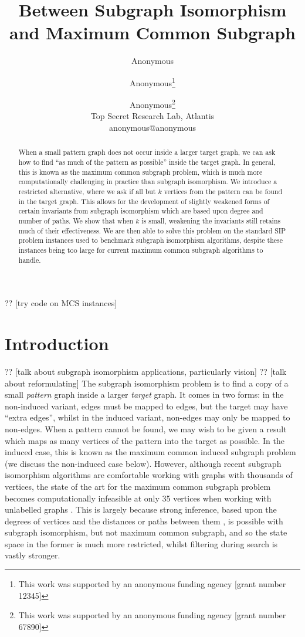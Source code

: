 \documentclass[letterpaper]{article}
\title{Between Subgraph Isomorphism and Maximum Common Subgraph}
\author{Anonymous \and Anonymous\thanks{This work was supported by an anonymous funding agency [grant number 12345]} \and Anonymous\thanks{This work was supported by an anonymous funding agency [grant number 67890]} \\
Top Secret Research Lab, Atlantis \\
anonymous@anonymous}
\newcommand{\citep}[1]{\cite{#1}}
\theoremstyle{definition}
\newcommand{\todo}[1]{{\color{red} {?? [}{#1}{]}}}
\begin{document}
\maketitle

\begin{abstract}
    When a small pattern graph does not occur inside a larger target graph, we can ask how to find
    ``as much of the pattern as possible'' inside the target graph. In general, this is known as the maximum
    common subgraph problem, which is much more computationally challenging in practice than
    subgraph isomorphism. We introduce a restricted alternative, where we ask if all but $k$
    vertices from the pattern can be found in the target graph. This allows for the development of
    slightly weakened forms of certain invariants from subgraph isomorphism which are based upon degree and
    number of paths.  We show that when $k$ is small, weakening the invariants still retains much of
    their effectiveness. We are then able to solve this problem on the standard SIP problem
    instances used to benchmark subgraph isomorphism algorithms, despite these instances being
    too large for current maximum common subgraph algorithms to handle.
\end{abstract}
\todo{try code on MCS instances}
\section{Introduction}
\todo{talk about subgraph isomorphism applications, particularly vision}
\todo{talk about reformulating}
The subgraph isomorphism problem is to find a copy of a small \emph{pattern} graph inside a larger
\emph{target} graph. It comes in two forms: in the non-induced variant, edges must be mapped to
edges, but the target may have ``extra edges'', whilst in the induced variant, non-edges may only be
mapped to non-edges. When a pattern cannot be found, we may wish to be given a result which maps as
many vertices of the pattern into the target as possible. In the induced case, this is known as the
maximum common induced subgraph problem (we discuss the non-induced case below). However, although
recent subgraph isomorphism algorithms are comfortable working with graphs with thousands of
vertices, the state of the art for the maximum common subgraph problem becomes computationally
infeasible at only 35 vertices when working with unlabelled graphs
\citep{DBLP:conf/cp/McCreeshNPS16}. This is largely because strong inference, based upon the degrees
of vertices \citep{DBLP:journals/ai/Solnon10} and the distances or paths between them
\citep{DBLP:conf/cp/AudemardLMGP14,DBLP:conf/cp/McCreeshP15}, is possible with subgraph isomorphism,
but not maximum common subgraph, and so the state space in the former is much more restricted,
whilst filtering during search is vastly stronger.
\end{document}
